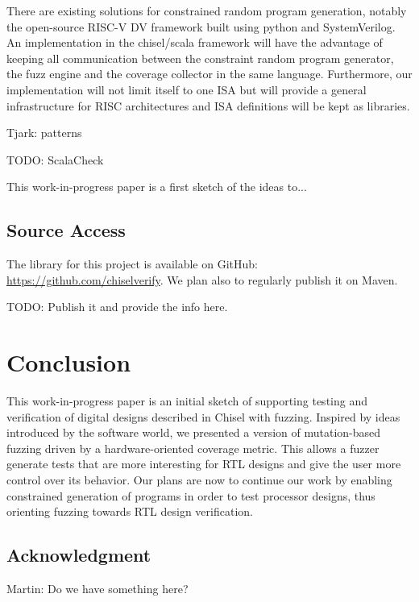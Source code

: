 \documentclass[conference]{IEEEtran}
\newcommand{\todo}[1]{{\color{olive} TODO: #1}}
\newcommand{\martin}[1]{{\color{blue} Martin: #1}}
\newcommand{\tjark}[1]{{\color{orange} Tjark: #1}}
\begin{document}
There are existing solutions for constrained random program generation, notably the open-source RISC-V DV framework \cite{riscvdv} built using python and SystemVerilog. An implementation in the chisel/scala framework will have the advantage of keeping all communication between the constraint random program generator, the fuzz engine and the coverage collector in the same language. Furthermore, our implementation will not limit itself to one ISA but will provide a general infrastructure for RISC architectures and ISA definitions will be kept as libraries.

\tjark{patterns}


\todo{ScalaCheck}

This work-in-progress paper is a first sketch of the ideas to...


\subsection{Source Access}

The library for this project is available on GitHub:\\ \url{https://github.com/chiselverify}.
We plan also to regularly publish it on Maven.

\todo{Publish it and provide the info here.}


\section{Conclusion}
\label{sec:conclusion}

This work-in-progress paper is an initial sketch of supporting testing and verification
of digital designs described in Chisel with fuzzing. 
Inspired by ideas introduced by the software world, we presented a version of mutation-based fuzzing driven by a hardware-oriented coverage metric.
This allows a fuzzer generate tests that are more interesting for RTL designs and give the user more control over its behavior. 
Our plans are now to continue our work by enabling constrained generation of programs in order to test processor designs, thus orienting fuzzing towards RTL design verification.




\subsection*{Acknowledgment}

\martin{Do we have something here?}




\end{document}
